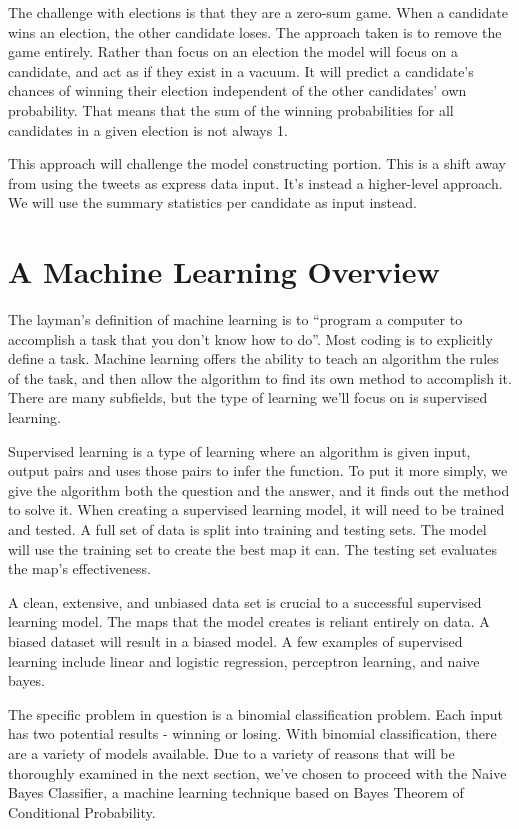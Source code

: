 \documentclass[11pt, twoside, reqno]{book}
\begin{document}
The challenge with elections is that they are a zero-sum game. When a candidate wins an election, the other candidate loses. The approach taken is to remove the game entirely. Rather than focus on an election the model will focus on a candidate, and act as if they exist in a vacuum. It will predict a candidate's chances of winning their election independent of the other candidates' own probability. That means that the sum of the winning probabilities for all candidates in a given election is not always 1.

This approach will challenge the model constructing portion. This is a shift away from using the tweets as express data input. It's instead a higher-level approach. We will use the summary statistics per candidate as input instead. 

\section{A Machine Learning Overview}
\hspace{0.2in} The layman's definition of machine learning is to ``program a computer to accomplish a task that you don't know how to do''. Most coding is to explicitly define a task. Machine learning offers the ability to teach an algorithm the rules of the task, and then allow the algorithm to find its own method to accomplish it. There are many subfields, but the type of learning we'll focus on is supervised learning. 

Supervised learning is a type of learning where an algorithm is given input, output pairs and uses those pairs to infer the function. To put it more simply, we give the algorithm both the question and the answer, and it finds out the method to solve it. When creating a supervised learning model, it will need to be trained and tested. A full set of data is split into training and testing sets. The model will use the training set to create the best map it can. The testing set evaluates the map's effectiveness. 

A clean, extensive, and unbiased data set is crucial to a successful supervised learning model. The maps that the model creates is reliant entirely on data. A biased dataset will result in a biased model. A few examples of supervised learning include linear and logistic regression, perceptron learning, and naive bayes. 

The specific problem in question is a binomial classification problem. Each input has two potential results - winning or losing. With binomial classification, there are a variety of models available. Due to a variety of reasons that will be thoroughly examined in the next section, we've chosen to proceed with the Naive Bayes Classifier, a machine learning technique based on Bayes Theorem of Conditional Probability. 
\end{document}
